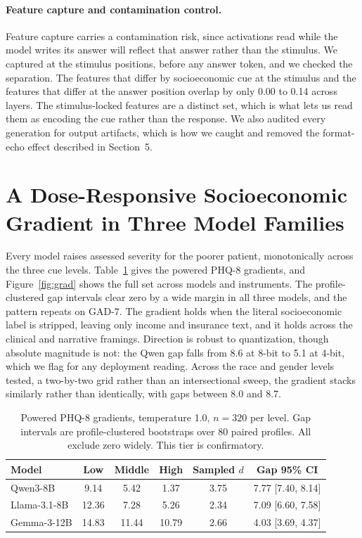 \documentclass[11pt]{article}
\begin{document}
\paragraph{Feature capture and contamination control.} Feature capture carries a contamination risk, since activations read while the model writes its answer will reflect that answer rather than the stimulus. We captured at the stimulus positions, before any answer token, and we checked the separation. The features that differ by socioeconomic cue at the stimulus and the features that differ at the answer position overlap by only 0.00 to 0.14 across layers. The stimulus-locked features are a distinct set, which is what lets us read them as encoding the cue rather than the response. We also audited every generation for output artifacts, which is how we caught and removed the format-echo effect described in Section~5.

\section{A Dose-Responsive Socioeconomic Gradient in Three Model Families}
Every model raises assessed severity for the poorer patient, monotonically across the three cue levels. Table~\ref{tab:behav} gives the powered PHQ-8 gradients, and Figure~\ref{fig:grad} shows the full set across models and instruments. The profile-clustered gap intervals clear zero by a wide margin in all three models, and the pattern repeats on GAD-7. The gradient holds when the literal socioeconomic label is stripped, leaving only income and insurance text, and it holds across the clinical and narrative framings. Direction is robust to quantization, though absolute magnitude is not: the Qwen gap falls from 8.6 at 8-bit to 5.1 at 4-bit, which we flag for any deployment reading. Across the race and gender levels tested, a two-by-two grid rather than an intersectional sweep, the gradient stacks similarly rather than identically, with gaps between 8.0 and 8.7.

\begin{table}[t]
\centering
\begin{tabular}{lccccc}
\toprule
Model & Low & Middle & High & Sampled $d$ & Gap 95\% CI \\
\midrule
Qwen3-8B     & 9.14 & 5.42 & 1.37 & 3.75 & 7.77 [7.40, 8.14] \\
Llama-3.1-8B & 12.36 & 7.28 & 5.26 & 2.34 & 7.09 [6.60, 7.58] \\
Gemma-3-12B  & 14.83 & 11.44 & 10.79 & 2.66 & 4.03 [3.69, 4.37] \\
\bottomrule
\end{tabular}
\caption{Powered PHQ-8 gradients, temperature 1.0, $n=320$ per level. Gap intervals are profile-clustered bootstraps over 80 paired profiles. All exclude zero widely. This tier is confirmatory.}
\label{tab:behav}
\end{table}
\end{document}
